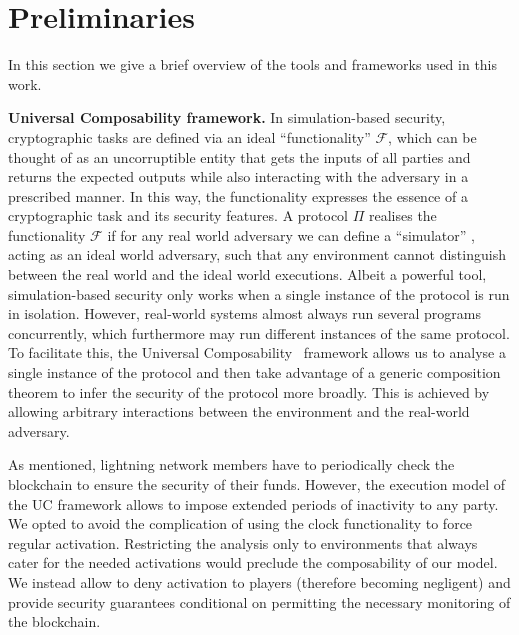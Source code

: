 \section{Preliminaries}
\label{sec:preliminaries}
  In this section we give a brief overview of the tools and frameworks
  used in this work.

  \noindent \textbf{Universal Composability framework.}
    In simulation-based security, cryptographic tasks are defined via an ideal
    ``functionality'' $\mathcal{F}$, which can be thought of as an uncorruptible
    entity that gets the inputs of all parties and returns the expected outputs
    while also interacting with the adversary in a prescribed manner. In this
    way, the functionality expresses the essence of a cryptographic task and its
    security features. A protocol $\Pi$ realises the functionality $\mathcal{F}$
    if for any  real world adversary we can define a ``simulator'' \simulator{},
    acting as an ideal world adversary, such that any environment
    \environment{} cannot distinguish between the real world and the
    ideal world executions. Albeit a powerful tool, simulation-based security
    only works when a single instance of the protocol is run in isolation.
    However, real-world systems almost always run several programs concurrently,
    which furthermore may run different instances of the same protocol. To
    facilitate this, the Universal Composability~\cite{uc} framework
    allows us to analyse a single instance of the protocol and then
    take advantage of a generic composition theorem to infer the security of the
    protocol more broadly. This is achieved by allowing arbitrary interactions
    between the environment and the real-world adversary.

    As mentioned, lightning network members have to periodically check
    the blockchain to ensure the security of their funds. However, the execution
    model of the UC framework allows \environment{} to impose extended periods
    of inactivity to any party. We opted to avoid the complication of using the
    clock functionality to force regular activation. Restricting the analysis
    only to environments that always cater for the needed activations would
    preclude the composability of our model. We instead allow \environment{} to
    deny activation to players (therefore becoming negligent) and provide
    security guarantees conditional on \environment{} permitting the necessary
    monitoring of the blockchain.

